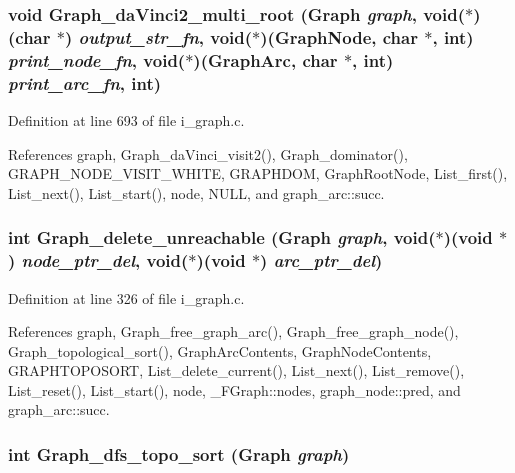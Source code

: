 \subsubsection{\setlength{\rightskip}{0pt plus 5cm}void Graph\_\-da\-Vinci2\_\-multi\_\-root (\bf{Graph} {\em graph}, void($\ast$)(char $\ast$) {\em output\_\-str\_\-fn}, void($\ast$)(\bf{Graph\-Node}, char $\ast$, int) {\em print\_\-node\_\-fn}, void($\ast$)(\bf{Graph\-Arc}, char $\ast$, int) {\em print\_\-arc\_\-fn}, int)}\label{i__graph_8h_f4fd5f915a35ec3f4aad832193d78b2b}




Definition at line 693 of file i\_\-graph.c.

References graph, Graph\_\-da\-Vinci\_\-visit2(), Graph\_\-dominator(), GRAPH\_\-NODE\_\-VISIT\_\-WHITE, GRAPHDOM, Graph\-Root\-Node, List\_\-first(), List\_\-next(), List\_\-start(), node, NULL, and graph\_\-arc::succ.
\subsubsection{\setlength{\rightskip}{0pt plus 5cm}int Graph\_\-delete\_\-unreachable (\bf{Graph} {\em graph}, void($\ast$)(void $\ast$) {\em node\_\-ptr\_\-del}, void($\ast$)(void $\ast$) {\em arc\_\-ptr\_\-del})}\label{i__graph_8h_cf09090933cd4d8c8dc7dbc024663472}




Definition at line 326 of file i\_\-graph.c.

References graph, Graph\_\-free\_\-graph\_\-arc(), Graph\_\-free\_\-graph\_\-node(), Graph\_\-topological\_\-sort(), Graph\-Arc\-Contents, Graph\-Node\-Contents, GRAPHTOPOSORT, List\_\-delete\_\-current(), List\_\-next(), List\_\-remove(), List\_\-reset(), List\_\-start(), node, \_\-FGraph::nodes, graph\_\-node::pred, and graph\_\-arc::succ.
\subsubsection{\setlength{\rightskip}{0pt plus 5cm}int Graph\_\-dfs\_\-topo\_\-sort (\bf{Graph} {\em graph})}\label{i__graph_8h_73b154de6c14de1fcd726763e52a686d}




